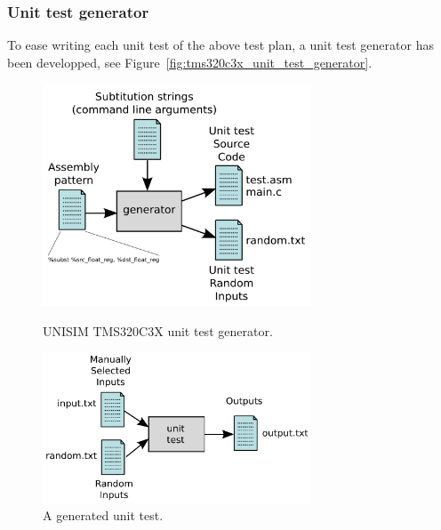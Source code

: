 \subsubsection{Unit test generator}

To ease writing each unit test of the above test plan, a unit test generator has been developped, see Figure~\ref{fig:tms320c3x_unit_test_generator}.

\begin{figure}[!h]
	\begin{center}
		\begin{minipage}{\textwidth}
			\begin{minipage}{8.0cm}
				\begin{center}
					\includegraphics[width=8.0cm]{tms320c3x/fig_unit_test_generator.pdf}
					\caption{\label{fig:tms320c3x_unit_test_generator}UNISIM TMS320C3X unit test generator.}
				\end{center}
			\end{minipage}
			\begin{minipage}{8.0cm}
				\begin{center}
					\includegraphics[width=8.0cm]{tms320c3x/fig_unit_test.pdf}
					\caption{\label{fig:tms320c3x_unit_test} A generated unit test.}
				\end{center}
			\end{minipage}
		\end{minipage}
		\vspace{0.5cm}

\end{center}
\end{figure}
